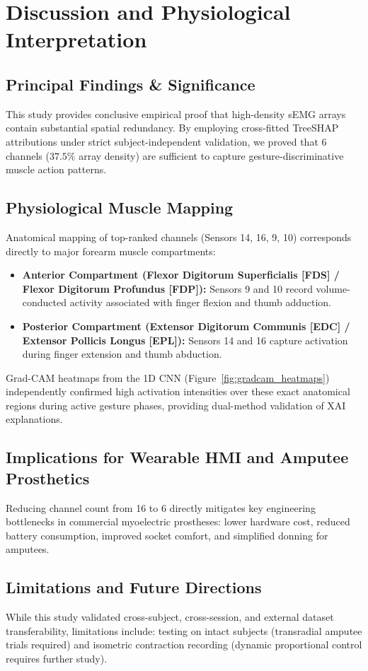 \documentclass[10pt,twocolumn,letterpaper]{article}
\begin{document}
\section{Discussion and Physiological Interpretation}

\subsection{Principal Findings \& Significance}
This study provides conclusive empirical proof that high-density sEMG arrays contain substantial spatial redundancy. By employing cross-fitted TreeSHAP attributions under strict subject-independent validation, we proved that 6 channels ($37.5\%$ array density) are sufficient to capture gesture-discriminative muscle action patterns.

\subsection{Physiological Muscle Mapping}
Anatomical mapping of top-ranked channels (Sensors 14, 16, 9, 10) corresponds directly to major forearm muscle compartments:
\begin{itemize}
    \item \textbf{Anterior Compartment (Flexor Digitorum Superficialis [FDS] / Flexor Digitorum Profundus [FDP]):} Sensors 9 and 10 record volume-conducted activity associated with finger flexion and thumb adduction.
    \item \textbf{Posterior Compartment (Extensor Digitorum Communis [EDC] / Extensor Pollicis Longus [EPL]):} Sensors 14 and 16 capture activation during finger extension and thumb abduction.
\end{itemize}
Grad-CAM heatmaps from the 1D CNN (Figure~\ref{fig:gradcam_heatmaps}) independently confirmed high activation intensities over these exact anatomical regions during active gesture phases, providing dual-method validation of XAI explanations.

\subsection{Implications for Wearable HMI and Amputee Prosthetics}
Reducing channel count from 16 to 6 directly mitigates key engineering bottlenecks in commercial myoelectric prostheses: lower hardware cost, reduced battery consumption, improved socket comfort, and simplified donning for amputees.

\subsection{Limitations and Future Directions}
While this study validated cross-subject, cross-session, and external dataset transferability, limitations include: testing on intact subjects (transradial amputee trials required) and isometric contraction recording (dynamic proportional control requires further study).
\end{document}

